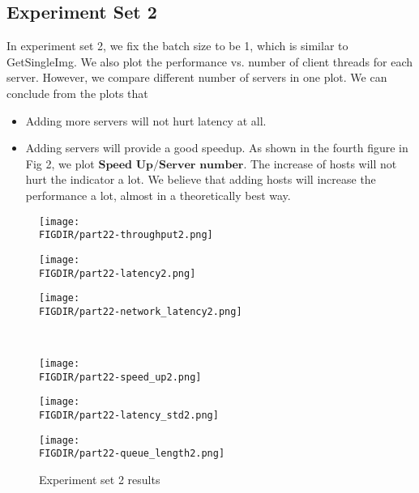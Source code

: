 \documentclass{article}
\begin{document}
\begin{spacing}{1.1}
\subsection{Experiment Set 2}
In experiment set 2, we fix the batch size to be 1, which is similar to GetSingleImg. We also plot the performance vs. number of client threads for each server. However, we compare different number of servers in one plot.
We can conclude from the plots that 
\begin{itemize}
    \item Adding more servers will not hurt latency at all. 
    \item Adding servers will provide a good speedup. As shown in the fourth figure in Fig 2, we plot $\textbf{Speed Up}/\textbf{Server number}$. The increase of hosts will not hurt the indicator a lot. We believe that adding hosts will increase the performance a lot, almost in a theoretically best way.
\end{itemize}
\begin{figure}[htbp]
    \centering
    \begin{minipage}{0.32\linewidth}
        \centering
	\texttt{[image: \\FIGDIR/part22-throughput2.png]}
	\label{throuput2}
    \end{minipage}
    \begin{minipage}{0.32\linewidth}
        \centering
        \texttt{[image: \\FIGDIR/part22-latency2.png]}
        \label{latency2}
    \end{minipage}
    \begin{minipage}{0.32\linewidth}
        \centering
        \texttt{[image: \\FIGDIR/part22-network\_latency2.png]}
        \label{network-latency2}
    \end{minipage} \\
    \begin{minipage}{0.32\linewidth}
        \centering
        \texttt{[image: \\FIGDIR/part22-speed\_up2.png]}
        \label{queue-latency2}
    \end{minipage}
    \begin{minipage}{0.32\linewidth}
        \centering
        \texttt{[image: \\FIGDIR/part22-latency\_std2.png]}
        \label{latency-std2}
    \end{minipage}
    \begin{minipage}{0.32\linewidth}
        \centering
        \texttt{[image: \\FIGDIR/part22-queue\_length2.png]}
        \label{queue-length2}
    \end{minipage}
    \caption{Experiment set 2 results}
\end{figure}


\end{spacing}
\end{document}
